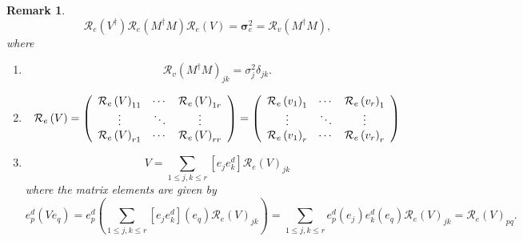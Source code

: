 \documentclass[aps,preprint]{revtex4}%
\newtheorem{remark}[theorem]{Remark}
\begin{document}
\begin{remark}%
\begin{equation}
\mathcal{R}_{e}\left(  V^{\dagger}\right)  \mathcal{R}_{e}\left(  M^{\dagger
}M\right)  \mathcal{R}_{e}\left(  V\right)  =\mathbf{\sigma}_{e}%
^{2}=\mathcal{R}_{v}\left(  M^{\dagger}M\right)  ,
\end{equation}
where

\begin{enumerate}
\item
\begin{equation}
\mathcal{R}_{v}\left(  M^{\dagger}M\right)  _{jk}=\sigma_{j}^{2}\delta_{jk}.
\end{equation}


\item
\begin{equation}
\mathcal{R}_{e}\left(  V\right)  =\left(
\begin{array}
[c]{ccc}%
\mathcal{R}_{e}\left(  V\right)  _{11} & \cdots & \mathcal{R}_{e}\left(
V\right)  _{1r}\\
\vdots & \ddots & \vdots\\
\mathcal{R}_{e}\left(  V\right)  _{r1} & \cdots & \mathcal{R}_{e}\left(
V\right)  _{rr}%
\end{array}
\right)  =\left(
\begin{array}
[c]{ccc}%
\mathcal{R}_{e}\left(  v_{1}\right)  _{1} & \cdots & \mathcal{R}_{e}\left(
v_{r}\right)  _{1}\\
\vdots & \ddots & \vdots\\
\mathcal{R}_{e}\left(  v_{1}\right)  _{r} & \cdots & \mathcal{R}_{e}\left(
v_{r}\right)  _{r}%
\end{array}
\right)
\end{equation}


\item
\begin{equation}
V=\sum_{1\leq j,k\leq r}\left[  e_{j}e_{k}^{d}\right]  \mathcal{R}_{e}\left(
V\right)  _{jk}%
\end{equation}
where the matrix elements are given by
\begin{equation}
e_{p}^{d}\left(  Ve_{q}\right)  =e_{p}^{d}\left(  \sum_{1\leq j,k\leq
r}\left[  e_{j}e_{k}^{d}\right]  \left(  e_{q}\right)  \mathcal{R}_{e}\left(
V\right)  _{jk}\right)  =\sum_{1\leq j,k\leq r}e_{p}^{d}\left(  e_{j}\right)
e_{k}^{d}\left(  e_{q}\right)  \mathcal{R}_{e}\left(  V\right)  _{jk}%
=\mathcal{R}_{e}\left(  V\right)  _{pq}.
\end{equation}



\end{enumerate}
\end{remark}
\end{document}

